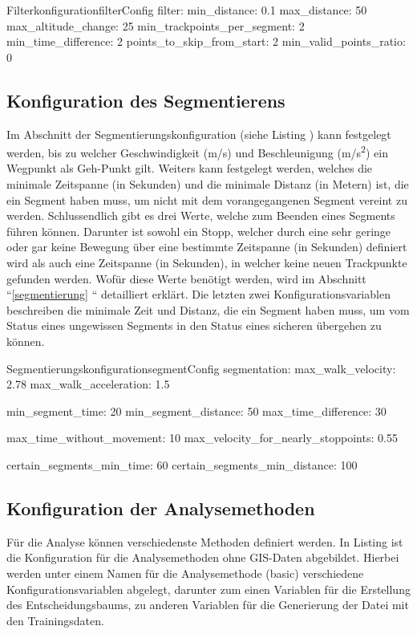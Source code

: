 \begin{code}[]{Filterkonfiguration}{filterConfig}
  filter:
    min_distance: 0.1
    max_distance: 50
    max_altitude_change: 25
    min_trackpoints_per_segment: 2
    min_time_difference: 2
    points_to_skip_from_start: 2
    min_valid_points_ratio: 0
\end{code}

\subsection{Konfiguration des Segmentierens}
Im Abschnitt der Segmentierungskonfiguration (siehe Listing ) kann festgelegt werden, bis zu welcher Geschwindigkeit (m/s) und Beschleunigung (m/s\textsuperscript{2}) ein Wegpunkt als Geh-Punkt gilt. Weiters kann festgelegt werden, welches die minimale Zeitspanne (in Sekunden) und die minimale Distanz (in Metern) ist, die ein Segment haben muss, um nicht mit dem vorangegangenen Segment vereint zu werden. Schlussendlich gibt es drei Werte, welche zum Beenden eines Segments führen können. Darunter ist sowohl ein Stopp, welcher durch eine sehr geringe oder gar keine Bewegung über eine bestimmte Zeitspanne (in Sekunden) definiert wird als auch eine Zeitspanne (in Sekunden), in welcher keine neuen Trackpunkte gefunden werden. Wofür diese Werte benötigt werden, wird im Abschnitt ``\ref{segmentierung} `` detailliert erklärt. Die letzten zwei Konfigurationsvariablen beschreiben die minimale Zeit und Distanz, die ein Segment haben muss, um vom Status eines ungewissen Segments in den Status eines sicheren übergehen zu können.

\begin{code}[]{Segmentierungskonfiguration}{segmentConfig}
  segmentation:   
    max_walk_velocity: 2.78
    max_walk_acceleration: 1.5
    
    min_segment_time: 20
    min_segment_distance: 50
    max_time_difference: 30
    
    max_time_without_movement: 10
    max_velocity_for_nearly_stoppoints: 0.55
    
    certain_segments_min_time: 60
    certain_segments_min_distance: 100
\end{code}

\subsection{Konfiguration der Analysemethoden}
Für die Analyse können verschiedenste Methoden definiert werden. In Listing  ist die Konfiguration für die Analysemethoden ohne GIS-Daten abgebildet. Hierbei werden unter einem Namen für die Analysemethode (basic) verschiedene Konfigurationsvariablen abgelegt, darunter zum einen Variablen für die Erstellung des Entscheidungsbaums, zu anderen Variablen für die Generierung der Datei mit den Trainingsdaten.

